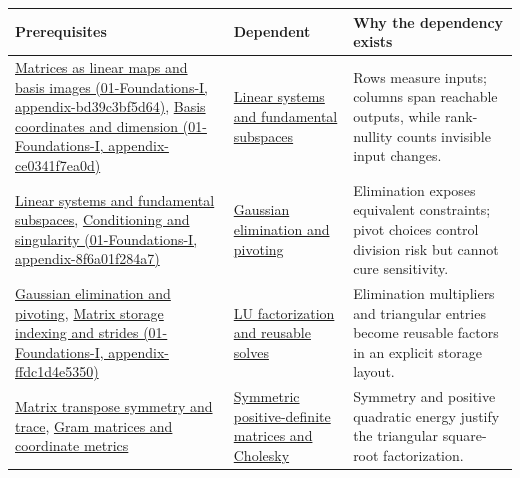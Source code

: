 {\def\LTcaptype{none} %
\begin{longtable}[]{@{}
  >{\raggedright\arraybackslash}p{}
  >{\raggedright\arraybackslash}p{}
  >{\raggedright\arraybackslash}p{}@{}}
\toprule\noalign{}
\begin{minipage}[b]{\linewidth}\raggedright
Prerequisites
\end{minipage} & \begin{minipage}[b]{\linewidth}\raggedright
Dependent
\end{minipage} & \begin{minipage}[b]{\linewidth}\raggedright
Why the dependency exists
\end{minipage} \\
\midrule\noalign{}
\endhead
\bottomrule\noalign{}
\endlastfoot
\href{../01-Foundations-I/main.pdf\#nameddest=appendix-bd39c3bf5d64}{Matrices as linear maps and basis images (01-Foundations-I, appendix-bd39c3bf5d64)}, \href{../01-Foundations-I/main.pdf\#nameddest=appendix-ce0341f7ea0d}{Basis coordinates and dimension (01-Foundations-I, appendix-ce0341f7ea0d)} & \hyperref[appendix-8572a4a060c1]{Linear systems and fundamental subspaces} & Rows measure inputs; columns span reachable outputs, while rank-nullity counts invisible input changes. \\
\hyperref[appendix-8572a4a060c1]{Linear systems and fundamental subspaces}, \href{../01-Foundations-I/main.pdf\#nameddest=appendix-8f6a01f284a7}{Conditioning and singularity (01-Foundations-I, appendix-8f6a01f284a7)} & \hyperref[appendix-f6e77f4a200f]{Gaussian elimination and pivoting} & Elimination exposes equivalent constraints; pivot choices control division risk but cannot cure sensitivity. \\
\hyperref[appendix-f6e77f4a200f]{Gaussian elimination and pivoting}, \href{../01-Foundations-I/main.pdf\#nameddest=appendix-ffdc1d4e5350}{Matrix storage indexing and strides (01-Foundations-I, appendix-ffdc1d4e5350)} & \hyperref[appendix-55e4b5b0a1e6]{LU factorization and reusable solves} & Elimination multipliers and triangular entries become reusable factors in an explicit storage layout. \\
\hyperref[appendix-175ca5ff874d]{Matrix transpose symmetry and trace}, \hyperref[appendix-3b863809f82a]{Gram matrices and coordinate metrics} & \hyperref[appendix-50d2ea3c9b26]{Symmetric positive-definite matrices and Cholesky} & Symmetry and positive quadratic energy justify the triangular square-root factorization. \\

\end{longtable}}
